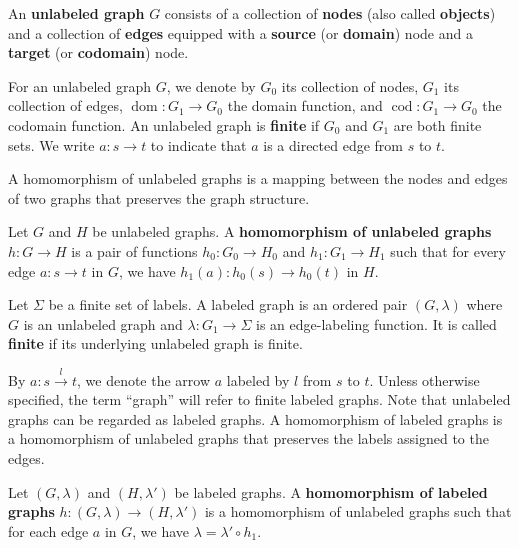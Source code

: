 \begin{definition}
    \label{def:graph:unlabeled}
    An \textbf{unlabeled graph} \( G \) consists of a collection of \textbf{nodes} (also called \textbf{objects}) and a collection of \textbf{edges} equipped with a \textbf{source} (or \textbf{domain}) node and a \textbf{target} (or \textbf{codomain}) node. 
    
    For an unlabeled graph \( G \), we denote by \( G_0 \) its collection of nodes, \( G_1 \) its collection of edges, \( \operatorname{dom}:G_1{\to}G_0 \) the domain function, and \( \operatorname{cod}:G_1{\to}G_0 \) the codomain function. An unlabeled graph is \textbf{finite} if \( G_0 \) and \( G_1 \) are both finite sets.
    We write \( a: s \to t \) to indicate that \( a \) is a directed edge from \( s \) to \( t \).
\end{definition}   
A homomorphism of unlabeled graphs is a mapping between the nodes and edges of two graphs that preserves the graph structure.
\begin{definition}
    \label{def:unlabeled_graph:homomorphism}
    Let \( G \) and \( H \) be unlabeled graphs. A \textbf{homomorphism of unlabeled graphs} \( h: G \to H \) is a pair of functions \( h_0: G_0 \to H_0 \) and \( h_1: G_1 \to H_1 \) such that for every edge \( a: s \to t \) in \( G \), we have \( h_1(a) : h_0(s) \to h_0(t) \) in \( H \).
\end{definition}
\begin{definition}
    \label{def:graph}
    Let \(\Sigma\) be a finite set of labels. A labeled graph is an ordered pair \((G,\lambda)\) where \( G \) is an unlabeled graph and \( \lambda : G_1 \rightarrow \Sigma\) is an edge-labeling function. 
    It is called \textbf{finite} if its underlying unlabeled graph is finite.  
\end{definition}
By $a : s\overset{l}{\rightarrow} t$, we denote the arrow $a$ labeled by $l$ from $s$ to $t$. Unless otherwise specified, the term \enquote{graph} will refer to finite labeled graphs. Note that unlabeled graphs can be regarded as labeled graphs. A homomorphism of labeled graphs is a homomorphism of unlabeled graphs that preserves the labels assigned to the edges.
\begin{definition}
    \label{def:graph:homomorphism}
    Let \( (G,\lambda) \) and \( (H,\lambda') \) be labeled graphs. A \textbf{homomorphism of labeled graphs} \( h:(G,\lambda) \rightarrow (H,\lambda') \) is a homomorphism of unlabeled graphs such that for each edge \( a \) in \( G \), we have \( \lambda = \lambda' \circ h_1 \).
\end{definition}
